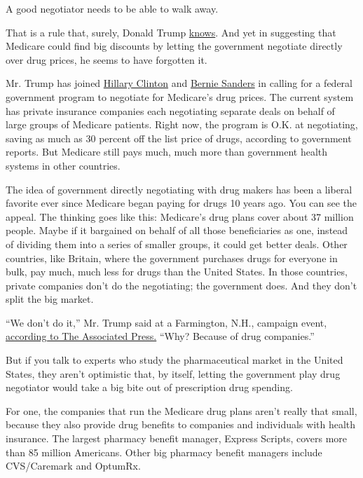 A good negotiator needs to be able to walk away.

That is a rule that, surely, Donald Trump
\href{http://www.nytimes.com/2015/09/20/upshot/donald-trump-and-the-art-of-the-public-sector-deal.html}{knows}.
And yet in suggesting that Medicare could find big discounts by letting
the government negotiate directly over drug prices, he seems to have
forgotten it.

Mr. Trump has joined
\href{https://www.hillaryclinton.com/briefing/factsheets/2015/09/21/hillary-clinton-plan-for-lowering-prescription-drug-costs/}{Hillary
Clinton} and
\href{https://berniesanders.com/issues/medicare-for-all/}{Bernie
Sanders} in calling for a federal government program to negotiate for
Medicare's drug prices. The current system has private insurance
companies each negotiating separate deals on behalf of large groups of
Medicare patients. Right now, the program is O.K. at negotiating, saving
as much as 30 percent off the list price of drugs, according to
government reports. But Medicare still pays much, much more than
government health systems in other countries.

The idea of government directly negotiating with drug makers has been a
liberal favorite ever since Medicare began paying for drugs 10 years
ago. You can see the appeal. The thinking goes like this: Medicare's
drug plans cover about 37 million people. Maybe if it bargained on
behalf of all those beneficiaries as one, instead of dividing them into
a series of smaller groups, it could get better deals. Other countries,
like Britain, where the government purchases drugs for everyone in bulk,
pay much, much less for drugs than the United States. In those
countries, private companies don't do the negotiating; the government
does. And they don't split the big market.

``We don't do it,'' Mr. Trump said at a Farmington, N.H., campaign
event,
\href{http://www.statnews.com/2016/01/26/trump-negotiate-drug-prices/}{according
to The Associated Press.} ``Why? Because of drug companies.''

But if you talk to experts who study the pharmaceutical market in the
United States, they aren't optimistic that, by itself, letting the
government play drug negotiator would take a big bite out of
prescription drug spending.

For one, the companies that run the Medicare drug plans aren't really
that small, because they also provide drug benefits to companies and
individuals with health insurance. The largest pharmacy benefit manager,
Express Scripts, covers more than 85 million Americans. Other big
pharmacy benefit managers include CVS/Caremark and OptumRx.

